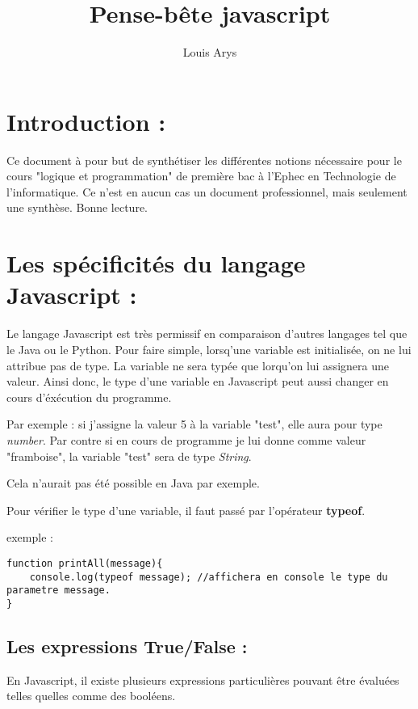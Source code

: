 \documentclass[a4paper, 11pt]{scrartcl}
\title{Pense-bête javascript}
\author{Louis Arys}
\begin{document}
\maketitle
\tableofcontents

\section{Introduction : }

Ce document à pour but de synthétiser les différentes notions nécessaire pour le cours "logique et programmation" de première bac à l'Ephec en Technologie de l'informatique.  Ce n'est en aucun cas un document professionnel, mais seulement une synthèse.  Bonne lecture.

\section{Les spécificités du langage Javascript :}

Le langage Javascript est très permissif en comparaison d'autres langages tel que le Java ou le Python.  Pour faire simple, lorsq'une variable est initialisée, on ne lui attribue pas de type.  La variable ne sera typée que lorqu'on lui assignera une valeur.  Ainsi donc, le type d'une variable en Javascript peut aussi changer en cours d'éxécution du programme.

Par exemple : si j'assigne la valeur 5 à la variable "test", elle aura pour type \textit{number}.  Par contre si en cours de programme je lui donne comme valeur "framboise", la variable "test" sera de type \textit{String}.

Cela n'aurait pas été possible en Java par exemple.

Pour vérifier le type d'une variable, il faut passé par l'opérateur \textbf{typeof}.

exemple :

\begin{lstlisting}
function printAll(message){
	console.log(typeof message); //affichera en console le type du parametre message.
}
\end{lstlisting}

\subsection{Les expressions True/False :}

En Javascript, il existe plusieurs expressions particulières pouvant être évaluées telles quelles comme des booléens.  
\end{document}
